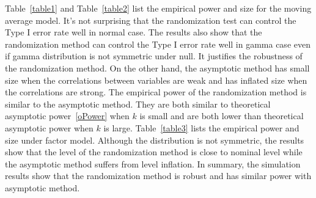 \documentclass[review]{elsarticle}
\theoremstyle{plain}
\theoremstyle{definition}
\theoremstyle{remark}
\begin{document}
Table~\ref{table1} and Table~\ref{table2} list the empirical power and size for the moving average model.
It's not surprising that the randomization test can  control the Type I error rate well in normal case.
The results also show that the randomization method can control the Type I error rate well in gamma case even if gamma distribution is not symmetric under null.
It justifies the robustness of the randomization method.
On the other hand, the asymptotic method has small size when the correlations between variables are weak and has inflated size when the correlations are strong.
The empirical power of the randomization method is similar to the asymptotic method.
They are both similar to theoretical asymptotic power~\eqref{oPower} when $k$ is small and are both lower than theoretical asymptotic power when $k$ is large.
Table~\ref{table3} lists the empirical power and size under factor model.
Although the distribution is not symmetric, the results show that the level of the randomization method is close to nominal level while the asymptotic method suffers from level inflation.
In summary, the simulation results show that the randomization method is robust and has similar power with asymptotic method.
\end{document}
